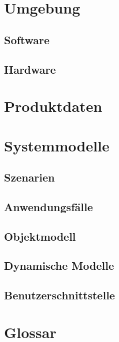 \documentclass[a4paper]{scrreprt}
\begin{document}
\chapter{Umgebung}
 
\section{Software}
 
\section{Hardware}
 
\chapter{Produktdaten}

\chapter{Systemmodelle}
\section{Szenarien}
\section{Anwendungsfälle}
\section{Objektmodell}
\section{Dynamische Modelle}
\section{Benutzerschnittstelle}
\clearpage
\chapter{Glossar}
\printglossary 
\end{document}
